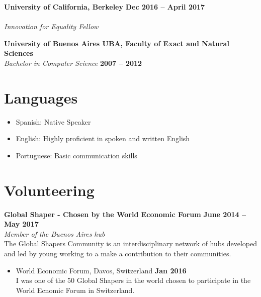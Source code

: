 \documentclass[margin,line]{resume}
\begin{document}
\begin{resume}
\textbf{University of California, Berkeley} \hfill \textbf{Dec 2016 -- April 2017}\vspace{-3mm}\\\vspace{-1mm}
\\
\textsl{Innovation for Equality Fellow} 


\textbf{University of Buenos Aires UBA, Faculty of Exact and Natural Sciences} \vspace{2mm}\\\vspace{1mm}
\textsl{Bachelor in Computer Science} \hfill \textbf{2007 -- 2012}\vspace{-3mm}\\\vspace{-1mm}

\section{\mysidestyle Languages}
\begin{itemize}
\item Spanish: Native Speaker
\item English:  Highly proficient in spoken and written English
\item Portuguese: Basic communication skills
\end{itemize}


\section{\mysidestyle Volunteering}



\textbf{Global Shaper - Chosen by the World Economic Forum} \hfill \textbf{June 2014 -- May 2017} \vspace{2mm}\\\vspace{1mm}
\textsl{Member of the Buenos Aires hub} \\
The Global Shapers Community is an interdisciplinary network of hubs developed and led by young working to a make a contribution to their communities.

\begin{itemize}
\item  World Economic Forum, Davos, Switzerland \hfill \textbf{Jan 2016} \vspace{2mm} \\
I was one of the 50 Global Shapers in the world chosen to participate in the World Ecnomic Forum in Switzerland.
\end{itemize}


\end{resume}
\end{document}
